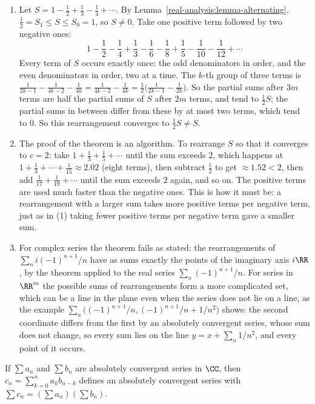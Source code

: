 \begin{example}\label{real-analysis:example-rearrangement}
\begin{enumerate}
\item Let $S = 1 - \frac12 + \frac13 - \frac14 + \cdots$. By Lemma~\ref{real-analysis:lemma-alternating}, $\frac12 = S_1 \leq S \leq S_0 = 1$, so $S \neq 0$. Take one positive term followed by two
negative ones:
\[
1 - \frac12 - \frac14 + \frac13 - \frac16 - \frac18 + \frac15 - \frac1{10} - \frac1{12} + \cdots
\]
Every term of $S$ occurs exactly once: the odd denominators in order, and the even denominators in order, two at a time. The $k$-th group of three terms is
$\frac{1}{2k - 1} - \frac{1}{4k - 2} - \frac{1}{4k} = \frac{1}{4k - 2} - \frac{1}{4k} = \frac12\bigl(\frac{1}{2k - 1} - \frac{1}{2k}\bigr)$. So the partial sums after $3m$ terms are half the partial
sums of $S$ after $2m$ terms, and tend to $\frac12S$; the partial sums in between differ from these by at most two terms, which tend to $0$. So this rearrangement converges to $\frac12S \neq S$.
\item The proof of the theorem is an algorithm. To rearrange $S$ so that it converges to $c = 2$: take $1 + \frac13 + \frac15 + \cdots$ until the sum exceeds $2$, which happens at
$1 + \frac13 + \cdots + \frac1{15} \approx 2.02$ (eight terms), then subtract $\frac12$ to get $\approx 1.52 < 2$, then add $\frac1{17} + \frac1{19} + \cdots$ until the sum exceeds $2$ again, and so on.
The positive terms are used much faster than the negative ones. This is how it must be: a rearrangement with a larger sum takes more positive terms per negative term, just as in (1)
taking fewer positive terms per negative term gave a smaller sum.
\item For complex series the theorem fails as stated: the rearrangements of $\sum_ni(-1)^{n+1}/n$ have as sums exactly the points of the imaginary axis $i\RR$, by the theorem applied to the real series
$\sum_n(-1)^{n+1}/n$. For series in $\RR^m$ the possible sums of rearrangements form a more complicated set, which can be a line in the plane even when the series does not lie on a line, as the example
$\sum_n\bigl((-1)^{n+1}/n, (-1)^{n+1}/n + 1/n^2\bigr)$ shows: the second coordinate differs from the first by an absolutely convergent series, whose sum does not change, so every sum lies on the line
$y = x + \sum_n1/n^2$, and every point of it occurs.
\end{enumerate}
\end{example}

\begin{proposition}\label{real-analysis:proposition-cauchy-product}
If $\sum a_n$ and $\sum b_n$ are absolutely convergent series in $\CC$, then $c_n = \sum_{k=0}^na_kb_{n-k}$ defines an absolutely convergent series with
$\sum c_n = (\sum a_n)(\sum b_n)$.
\end{proposition}


